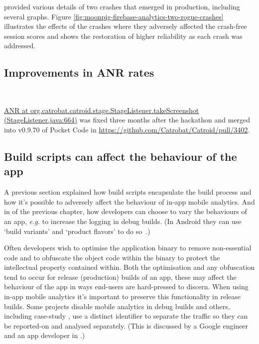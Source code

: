 provided various details of two crashes that emerged in production, including several graphs. Figure \ref{fig:moonpig-firebase-analytics-two-rogue-crashes} illustrates the effects of the crashes where they adversely affected the crash-free session scores and shows the restoration of higher reliability as each crash was addressed.


\subsection{Improvements in ANR rates}~\label{aata_improvements_in_anr_rates_topic}

\href{https://jira.catrob.at/browse/CATROID-411}{ANR at org.catrobat.catroid.stage.StageListener.takeScreenshot (StageListener.java:664)} was fixed three months after the hackathon and merged into v0.9.70 of Pocket Code in \url{https://github.com/Catrobat/Catroid/pull/3402}.


\subsection{Build scripts can affect the behaviour of the app}
A previous section  explained how build scripts encapsulate the build process and how it's possible to adversely affect the behaviour of in-app mobile analytics. And in  of the previous chapter, how developers can choose to vary the behaviours of an app, \emph{e.g.} to increase the logging in debug builds. (In Android they can use `build variants' and `product flavors' to do so~.)

Often developers wish to optimise the application binary to remove non-essential code and to obfuscate the object code within the binary to protect the intellectual property contained within. Both the optimisation and any obfuscation tend to occur for release (production) builds of an app, these may affect the behaviour of the app in ways end-users are hard-pressed to discern. When using in-app mobile analytics it's important to preserve this functionality in release builds. Some projects disable mobile analytics in debug builds and others, including case-study , use a distinct identifier to separate the traffic so they can be reported-on and analysed separately. (This is discussed by a Google engineer and an app developer in .)


